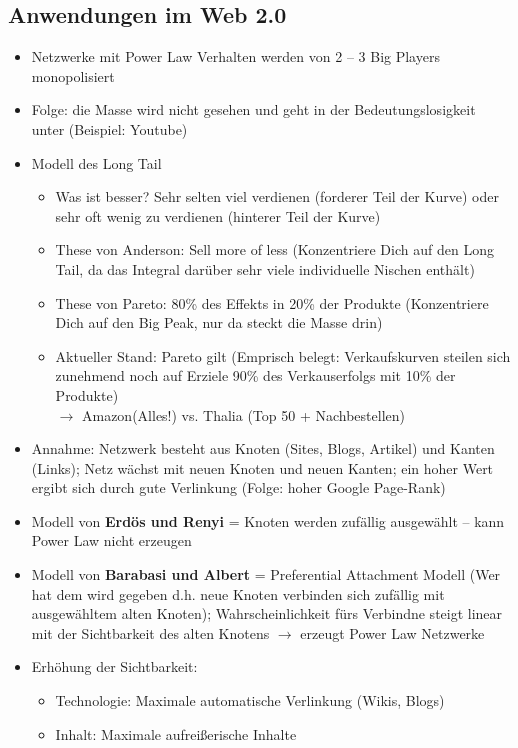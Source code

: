 \documentclass{article} %
\begin{document}
	\subsection{Anwendungen im Web 2.0}
	\begin{itemize}
		\item Netzwerke mit Power Law Verhalten werden von 2 – 3 Big Players monopolisiert
		\item Folge: die Masse wird nicht gesehen und geht in der Bedeutungslosigkeit unter (Beispiel: Youtube)
		\item Modell des Long Tail
		\begin{itemize}
			\item Was ist besser? Sehr selten viel verdienen (forderer Teil der Kurve) oder sehr oft wenig zu verdienen (hinterer Teil der Kurve)
			\item These von Anderson: Sell more of less (Konzentriere Dich auf den Long Tail, da das Integral darüber sehr viele individuelle Nischen enthält)
			\item These von Pareto: 80\% des Effekts in 20\% der Produkte (Konzentriere Dich auf den Big Peak, nur da steckt die Masse drin) 
			\item Aktueller Stand: Pareto gilt (Emprisch belegt: Verkaufskurven steilen sich zunehmend noch auf
			Erziele 90\% des Verkauserfolgs mit 10\% der Produkte)\\		$\rightarrow$ Amazon(Alles!) vs. Thalia (Top 50 + Nachbestellen)
		\end{itemize}
		\item Annahme: Netzwerk besteht aus Knoten (Sites, Blogs, Artikel) und Kanten (Links); Netz wächst mit neuen Knoten und neuen Kanten; ein hoher Wert ergibt sich durch gute Verlinkung (Folge: hoher Google Page-Rank)
		\item Modell von \textbf{Erdös und Renyi} = Knoten werden zufällig ausgewählt – kann Power Law nicht erzeugen
		\item Modell von \textbf{Barabasi und Albert} = Preferential Attachment Modell (Wer hat dem wird gegeben d.h. neue Knoten verbinden sich zufällig mit ausgewähltem alten Knoten); Wahrscheinlichkeit fürs Verbindne steigt linear mit der Sichtbarkeit des alten Knotens $\rightarrow$ erzeugt Power Law Netzwerke
		\item Erhöhung der Sichtbarkeit:
		\begin{itemize}
			\item Technologie: Maximale automatische Verlinkung (Wikis, Blogs)
			\item Inhalt: Maximale aufreißerische Inhalte

\end{itemize}
\end{itemize}
\end{document}
